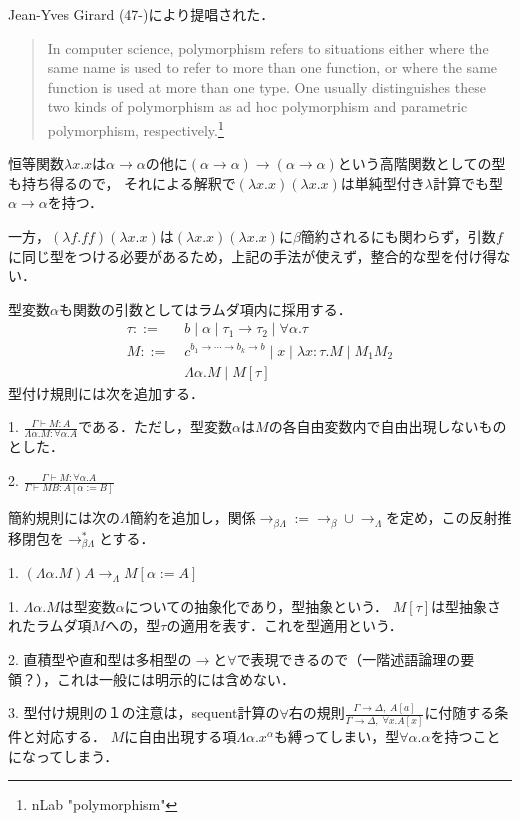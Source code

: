 \documentclass[uplatex, 12pt, dvipdfmx]{jsreport}
\begin{document}
Jean-Yves Girard (47-)により提唱された．
\begin{quote}
    In computer science, polymorphism refers to situations either where the same name is used to refer to more than one function, or where the same function is used at more than one type. One usually distinguishes these two kinds of polymorphism as ad hoc polymorphism and parametric polymorphism, respectively.\footnote{nLab "polymorphism"}
\end{quote}

\begin{example}
    恒等関数$\lambda x.x$は$\alpha\to\alpha$の他に$(\alpha\to\alpha)\to(\alpha\to\alpha)$という高階関数としての型も持ち得るので，
    それによる解釈で$(\lambda x.x)(\lambda x.x)$は単純型付き$\lambda$計算でも型$\alpha\to\alpha$を持つ．

    一方，$(\lambda f.ff)(\lambda x.x)$は$(\lambda x.x)(\lambda x.x)$に$\beta$簡約されるにも関わらず，引数$f$に同じ型をつける必要があるため，上記の手法が使えず，整合的な型を付け得ない．
\end{example}
\begin{shadebox}\begin{definition}
    型変数$\alpha$も関数の引数としてはラムダ項内に採用する．
    \begin{align*}
        \tau ::=&\; b\mid \alpha\mid \tau_1\to\tau_2 \mid \forall\alpha.\tau \\
        M ::=&\; c^{b_1\to\cdots\to b_k\to b}\mid x\mid \lambda x:\tau.M\mid M_1M_2 \\
        &\; \Lambda\alpha.M\mid M[\tau]
    \end{align*}
    型付け規則には次を追加する．

    1. $\frac{\Gamma\vdash M:A}{\Lambda\alpha.M:\forall\alpha.A}$である．ただし，型変数$\alpha$は$M$の各自由変数内で自由出現しないものとした．

    2. $\frac{\Gamma\vdash M:\forall\alpha.A}{\Gamma\vdash MB:A[\alpha:=B]}$

    簡約規則には次の$\Lambda$簡約を追加し，関係$\to_{\beta\Lambda}:=\to_\beta\cup\to_\Lambda$を定め，この反射推移閉包を$\to_{\beta\Lambda}^*$とする．

    1. $(\Lambda\alpha.M)A\to_\Lambda M[\alpha:=A]$
\end{definition}\end{shadebox}
\begin{remark}
    1. $\Lambda\alpha.M$は型変数$\alpha$についての抽象化であり，型抽象という．
    $M[\tau]$は型抽象されたラムダ項$M$への，型$\tau$の適用を表す．これを型適用という．

    2. 直積型や直和型は多相型の$\to$と$\forall$で表現できるので（一階述語論理の要領？），これは一般には明示的には含めない．

    3. 型付け規則の１の注意は，sequent計算の$\forall$右の規則$\frac{\Gamma\to\Delta,\;A[a]}{\Gamma\to\Delta,\;\forall x.A[x]}$に付随する条件と対応する．
    $M$に自由出現する項$\Lambda\alpha.x^\alpha$も縛ってしまい，型$\forall\alpha.\alpha$を持つことになってしまう．
\end{remark}
\end{document}
